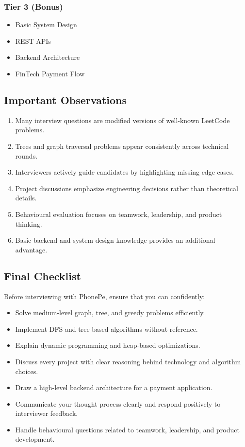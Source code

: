 \documentclass[11pt,a4paper]{article}
\begin{document}
\subsubsection{Tier 3 (Bonus)}

\begin{itemize}
	\item Basic System Design
	\item REST APIs
	\item Backend Architecture
	\item FinTech Payment Flow
\end{itemize}


\subsection{Important Observations}

\begin{enumerate}
	\item Many interview questions are modified versions of well-known LeetCode problems.
	\item Trees and graph traversal problems appear consistently across technical rounds.
	\item Interviewers actively guide candidates by highlighting missing edge cases.
	\item Project discussions emphasize engineering decisions rather than theoretical details.
	\item Behavioural evaluation focuses on teamwork, leadership, and product thinking.
	\item Basic backend and system design knowledge provides an additional advantage.
\end{enumerate}


\subsection{Final Checklist}

Before interviewing with PhonePe, ensure that you can confidently:

\begin{itemize}
	\item Solve medium-level graph, tree, and greedy problems efficiently.
	\item Implement DFS and tree-based algorithms without reference.
	\item Explain dynamic programming and heap-based optimizations.
	\item Discuss every project with clear reasoning behind technology and algorithm choices.
	\item Draw a high-level backend architecture for a payment application.
	\item Communicate your thought process clearly and respond positively to interviewer feedback.
	\item Handle behavioural questions related to teamwork, leadership, and product development.
\end{itemize}
\end{document}
